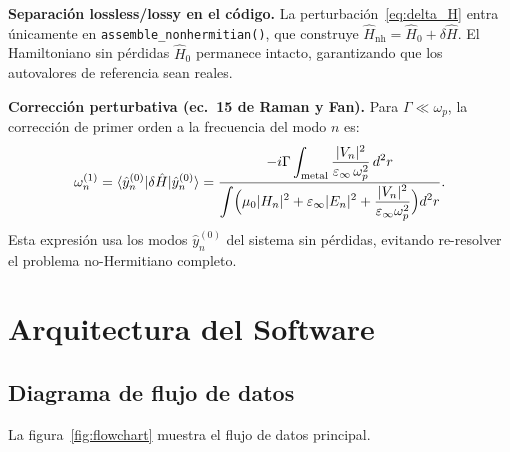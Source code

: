 \documentclass[12pt,a4paper]{article}
\newcommand{\Hhat}{\hat{H}}
\newcommand{\omegap}{\omega_p}
\newcommand{\epsinf}{\varepsilon_\infty}
\begin{document}
\textbf{Separación lossless/lossy en el código.}
La perturbación~\eqref{eq:delta_H} entra únicamente en
\texttt{assemble\_nonhermitian()}, que construye $\Hhat_\text{nh} = \Hhat_0 + \delta\Hhat$.
El Hamiltoniano sin pérdidas $\Hhat_0$ permanece intacto, garantizando que
los autovalores de referencia sean reales.

\textbf{Corrección perturbativa (ec.\ 15 de Raman y Fan).}
Para $\Gamma \ll \omegap$, la corrección de primer orden a la frecuencia
del modo $n$ es:
\begin{equation}
  \omega_n^{(1)} = \langle \hat{y}_n^{(0)} | \delta\Hhat | \hat{y}_n^{(0)} \rangle
    = \frac{-i\Gamma\displaystyle\int_\text{metal}
        \frac{|V_n|^2}{\epsinf\,\omegap^2}\,d^2r}
      {\displaystyle\int \Bigl(\mu_0|H_n|^2 + \epsinf|E_n|^2
        + \frac{|V_n|^2}{\epsinf\omegap^2}\Bigr)d^2r}.
  \label{eq:perturbative}
\end{equation}
Esta expresión usa los modos $\hat{y}_n^{(0)}$ del sistema sin pérdidas,
evitando re-resolver el problema no-Hermitiano completo.

\section{Arquitectura del Software}

\subsection{Diagrama de flujo de datos}

La figura~\ref{fig:flowchart} muestra el flujo de datos principal.
\end{document}
